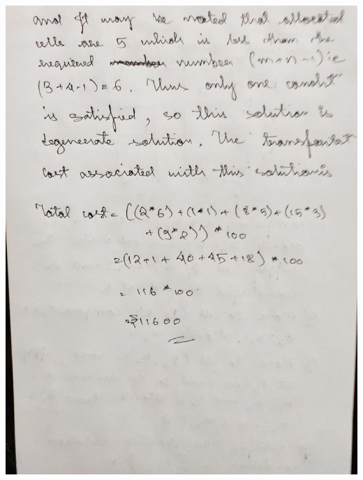 \documentclass[12pt, letterpaper, twoside]{book}
\begin{document}
\includegraphics[width=\paperwidth, height=\paperheight]{Page6}
\end{document}
